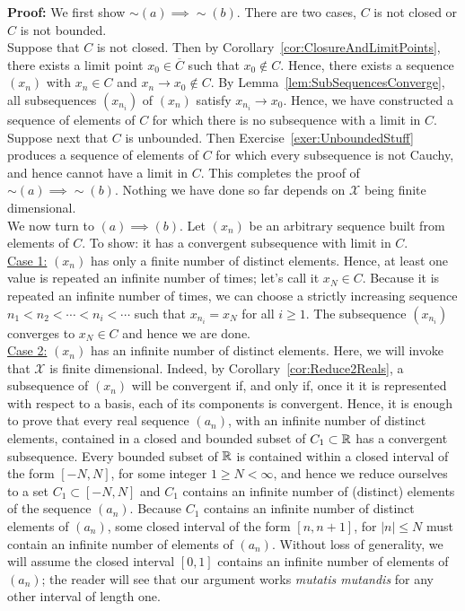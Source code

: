\textbf{Proof:} We first show $\sim(a) \implies \sim (b)$. There are two cases, $C$ is not closed or $C$ is not bounded. \\

Suppose that $C$ is not closed. Then by Corollary~\ref{cor:ClosureAndLimitPoints}, there exists a limit point $x_0 \in \overline{C}$ such that $x_0 \not \in C$. Hence, there exists a sequence $(x_n)$ with $x_n \in C$ and $x_n \to x_0 \not \in C$. By Lemma~\ref{lem:SubSequencesConverge}, all subsequences $(x_{n_i})$ of $(x_n)$ satisfy $x_{n_i} \to x_0$. Hence, we have constructed a sequence of elements of $C$ for which there is no subsequence with a limit in $C$. \\

Suppose next that $C$ is unbounded. Then Exercise~\ref{exer:UnboundedStuff} produces a  sequence of elements of $C$ for which every subsequence is not Cauchy, and hence cannot have a limit in $C$. This completes the proof of $\sim(a) \implies \sim (b)$. Nothing we have done so far depends on $\mathcal{X}$ being finite dimensional.\\

We now turn to $(a) \implies (b)$. Let $(x_n)$ be an arbitrary sequence built from elements of $C$. To show: it has a convergent subsequence with limit in $C$.\\

\ul{Case 1:}  $(x_n)$ has only a finite number of distinct elements. Hence, at least one value is repeated an infinite number of times; let's call it $x_N \in C$. Because it is repeated an infinite number of times, we can choose a strictly increasing sequence $n_1 < n_2 < \cdots < n_i < \cdots$ such that $x_{n_i}=x_N$ for all $i \ge 1$. The subsequence $(x_{n_i})$ converges to $x_N \in C$ and hence we are done.\\

\ul{Case 2:} $(x_n)$ has an infinite number of distinct elements. Here, we will invoke that $\mathcal{X}$ is finite dimensional. Indeed, by Corollary~\ref{cor:Reduce2Reals}, a subsequence of $(x_n)$ will be convergent if, and only if, once it it is represented with respect to a basis, each of its components is convergent. Hence, it is enough to prove that every real sequence $(a_n)$, with an infinite number of distinct elements, contained in a closed and bounded subset of $C_1 \subset \mathbb R$ has a convergent subsequence. Every bounded subset of $\mathbb R$ is contained within a closed interval of the form $[-N, N]$, for some integer $1 \ge N < \infty$, and hence we reduce ourselves to a set $C_1 \subset [-N, N]$ and $C_1$ contains an infinite number of (distinct) elements of the sequence $(a_n)$. Because $C_1$ contains an infinite number of distinct elements of $(a_n)$, some closed interval of the form $[n, n+1]$, for $|n|\le N$ must contain an infinite number of elements of $(a_n)$. Without loss of generality, we will assume the closed interval $[0, 1]$ contains an infinite number of elements of $(a_n)$; the reader will see that our argument works \emph{mutatis mutandis} for any other interval of length one.\\


